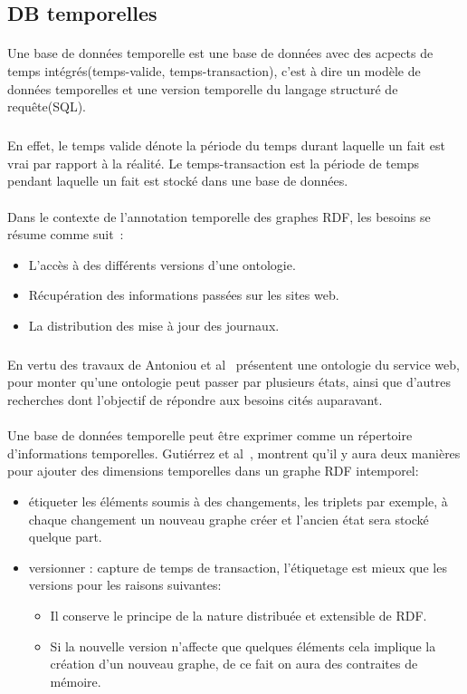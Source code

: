 \subsection*{DB temporelles}
\paragraph{}
Une base de données temporelle est une base de données avec des acpects de temps intégrés(temps-valide, temps-transaction), c'est à dire un modèle de données temporelles et une version temporelle du langage structuré de requête(SQL).
\subparagraph{}
En effet, le temps valide dénote la période du temps durant laquelle un fait est vrai par rapport à la réalité.
Le temps-transaction est la période de temps pendant laquelle un fait est stocké dans une base de données.
\paragraph{}
Dans le contexte de l'annotation temporelle des graphes RDF, les besoins se résume comme suit~:
\begin{itemize}
\item L'accès à des différents versions d’une ontologie.
\item Récupération des informations passées sur les sites web.
\item La distribution des mise à jour des journaux.
\end{itemize}
\subparagraph{}
En vertu des travaux de Antoniou et al~\cite{antoniou2004} présentent une ontologie du service web, pour monter qu'une ontologie peut passer par plusieurs états, ainsi que d'autres recherches dont l'objectif de répondre aux besoins cités auparavant. ~
\paragraph{}
Une base de données temporelle peut être exprimer comme un répertoire d'informations temporelles.
Gutiérrez et al~\cite{gutierrez2007}, montrent qu'il y aura deux manières pour ajouter des dimensions temporelles dans un graphe RDF intemporel:
\begin{itemize}
\item étiqueter les éléments soumis à des changements, les triplets par exemple, à chaque changement un nouveau graphe créer et l’ancien état sera stocké quelque part.
\item versionner : capture de temps de transaction, l’étiquetage est mieux que les versions pour les raisons suivantes: 
 \begin{itemize}
\item Il conserve le principe de la nature distribuée et extensible de RDF.
\item Si la nouvelle version n’affecte que quelques éléments cela implique la création d’un nouveau graphe, de ce fait on aura des contraites de mémoire.
\end{itemize}
\end{itemize}
